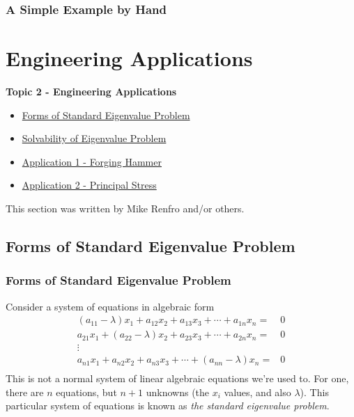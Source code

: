 \documentclass[fleqn]{ltx-talk} %
\newcommand{\sectionIItitle}{Engineering Applications}
\newcommand{\sectionIsubsectionIVtitle}{A Simple Example by Hand}
\newcommand{\sectionIIsubsectionItitle}{Forms of Standard Eigenvalue Problem}
\newcommand{\sectionIIsubsectionIItitle}{Solvability of Eigenvalue Problem}
\newcommand{\sectionIIsubsectionIIItitle}{Application 1 - Forging Hammer}
\newcommand{\sectionIIsubsectionIVtitle}{Application 2 - Principal Stress}
\begin{document}
			\begin{frame}
				\frametitle{\sectionIsubsectionIVtitle}
				\bigskip


				\btVFill
			\end{frame}
	
	\section{\sectionIItitle}\label{sectionII}

		\begin{frame}
			\large \textbf{Topic 2 - \sectionIItitle} \vspace{3mm}\\

			\begin{itemize}
				\item \hyperref[sectionIIsubsectionI]{\sectionIIsubsectionItitle} \vspc %
				\item \hyperref[sectionIIsubsectionII]{\sectionIIsubsectionIItitle} \vspc %
				\item \hyperref[sectionIIsubsectionIII]{\sectionIIsubsectionIIItitle} \vspc %
				\item \hyperref[sectionIIsubsectionIV]{\sectionIIsubsectionIVtitle} \vspc %
			\end{itemize}

			This section was written by Mike Renfro and/or others.

		\end{frame}

		\subsection{\sectionIIsubsectionItitle}\label{sectionIIsubsectionI}

			\begin{frame}
				\frametitle{\sectionIIsubsectionItitle} \small
				\bigskip

				 Consider a system of equations in algebraic form
  \begin{align*}
    (a_{11}-\lambda) x_1 + a_{12} x_2 + a_{13} x_3 + \cdots + a_{1n} x_n =& 0 \\
    a_{21} x_1 + (a_{22}-\lambda) x_2 + a_{23} x_3 + \cdots + a_{2n} x_n =& 0 \\
    \vdots{}& \\
    a_{n1} x_1 + a_{n2} x_2 + a_{n3} x_3 + \cdots + (a_{nn}-\lambda) x_n =& 0 \\
  \end{align*}
  This is not a normal system of linear algebraic equations we're used
  to. For one, there are $n$ equations, but $n+1$ unknowns (the $x_i$
  values, and also $\lambda$). This particular system of equations is
  known as \emph{the standard eigenvalue problem}.


				\btVFill
			\end{frame}
\end{document}
